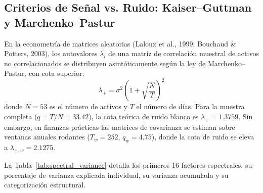 \documentclass[11pt,a4paper]{article}
\begin{document}
\subsection{Criterios de Señal vs. Ruido: Kaiser--Guttman y Marchenko--Pastur}

En la econometría de matrices aleatorias (Laloux et al., 1999; Bouchaud \& Potters, 2003), los autovalores $\lambda_i$ de una matriz de correlación muestral de activos no correlacionados se distribuyen asintóticamente según la ley de Marchenko--Pastur, con cota superior:
\begin{equation}
\lambda_+ = \sigma^2 \left(1 + \sqrt{\frac{N}{T}}\right)^2
\end{equation}
donde $N = 53$ es el número de activos y $T$ el número de días. Para la muestra completa ($q = T/N = 33.42$), la cota teórica de ruido blanco es $\lambda_+ = 1.3759$. Sin embargo, en finanzas prácticas las matrices de covarianza se estiman sobre ventanas anuales rodantes ($T_w = 252$, $q_w = 4.75$), donde la cota de ruido se eleva a $\lambda_{+, w} = 2.1275$.

La Tabla~\ref{tab:spectral_variance} detalla los primeros 16 factores espectrales, su porcentaje de varianza explicada individual, su varianza acumulada y su categorización estructural.
\end{document}
